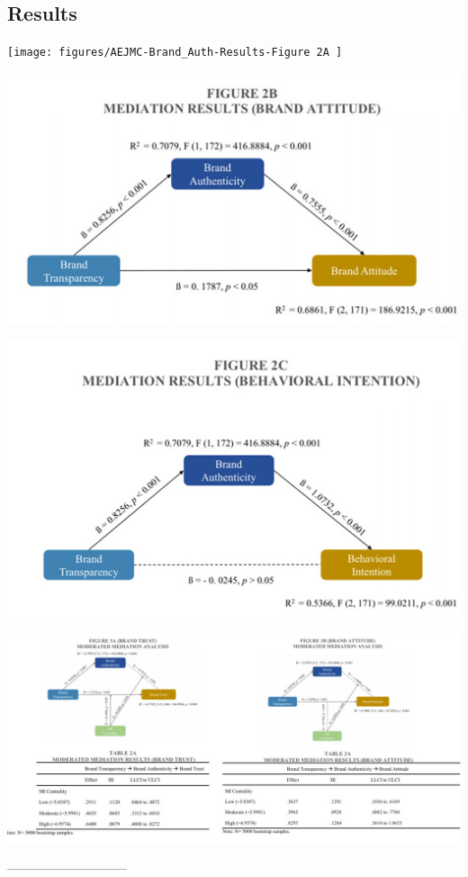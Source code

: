 \documentclass[a0,portrait]{a0poster}
\begin{document}
\begin{minipage}[c]{\linewidth}
\begin{framed}
\begin{multicols}{2}
\color{Maroon}
\section*{Results}
\color{Black}

\begin{center}
\texttt{[image: figures/AEJMC-Brand\_Auth-Results-Figure 2A ]}
\label{ALICerros}
\end{center}

\begin{center}
\includegraphics[width=0.5\linewidth]{figures/AEJMC-Brand_Auth-Results-Figure 2B}
\label{ALICerros}
\end{center}

\begin{center}
\includegraphics[width=0.5\linewidth]{figures/AEJMC-Brand_Auth-Results-Figure 2C}
\label{ALICerros}
\end{center}

\begin{center}
\includegraphics[width=0.7\linewidth]{AEJMC-Brand_Auth-Results-3A_3B}
\label{ALICerros}
\end{center}
-----------------------------
\color{Maroon}

\end{multicols}
\end{framed}
\end{minipage}
\end{document}
